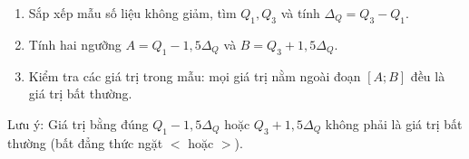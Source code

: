 \begin{enumerate}
\item Sắp xếp mẫu số liệu không giảm, tìm $Q_1, Q_3$ và tính $\Delta_Q = Q_3 - Q_1$.
\item Tính hai ngưỡng $A = Q_1 - 1{,}5\Delta_Q$ và $B = Q_3 + 1{,}5\Delta_Q$.
\item Kiểm tra các giá trị trong mẫu: mọi giá trị nằm ngoài đoạn $[A; B]$ đều là giá trị bất thường.
\end{enumerate}
Lưu ý: Giá trị bằng đúng $Q_1 - 1{,}5\Delta_Q$ hoặc $Q_3 + 1{,}5\Delta_Q$ không phải là giá trị bất thường (bất đẳng thức ngặt $<$ hoặc $>$).
